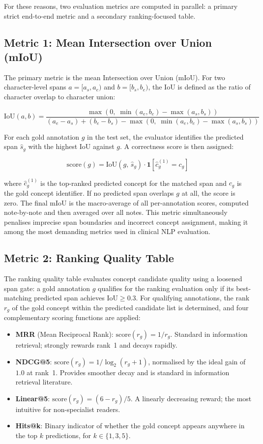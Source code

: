 For these reasons, two evaluation metrics are computed in parallel: a primary strict end-to-end metric and a secondary ranking-focused table.

\subsection{Metric 1: Mean Intersection over Union (mIoU)}

The primary metric is the mean Intersection over Union (mIoU). For two character-level spans $a = [a_s, a_e)$ and $b = [b_s, b_e)$, the IoU is defined as the ratio of character overlap to character union:

$$\text{IoU}(a, b) = \frac{\max(0,\; \min(a_e, b_e) - \max(a_s, b_s))}{(a_e - a_s) + (b_e - b_s) - \max(0,\; \min(a_e, b_e) - \max(a_s, b_s))}$$

For each gold annotation $g$ in the test set, the evaluator identifies the predicted span $\hat{s}_g$ with the highest IoU against $g$. A correctness score is then assigned:

$$\text{score}(g) = \text{IoU}(g,\, \hat{s}_g) \cdot \mathbf{1}\!\left[\hat{c}^{(1)}_g = c_g\right]$$

where $\hat{c}^{(1)}_g$ is the top-ranked predicted concept for the matched span and $c_g$ is the gold concept identifier. If no predicted span overlaps $g$ at all, the score is zero. The final mIoU is the macro-average of all per-annotation scores, computed note-by-note and then averaged over all notes. This metric simultaneously penalises imprecise span boundaries and incorrect concept assignment, making it among the most demanding metrics used in clinical NLP evaluation.

\subsection{Metric 2: Ranking Quality Table}

The ranking quality table evaluates concept candidate quality using a loosened span gate: a gold annotation $g$ qualifies for the ranking evaluation only if its best-matching predicted span achieves $\text{IoU} \geq 0.3$. For qualifying annotations, the rank $r_g$ of the gold concept within the predicted candidate list is determined, and four complementary scoring functions are applied:

\begin{itemize}
    \item \textbf{MRR} (Mean Reciprocal Rank): $\text{score}(r_g) = 1/r_g$. Standard in information retrieval; strongly rewards rank~1 and decays rapidly.
    \item \textbf{NDCG@5}: $\text{score}(r_g) = 1/\log_2(r_g + 1)$, normalised by the ideal gain of $1.0$ at rank~1. Provides smoother decay and is standard in information retrieval literature.
    \item \textbf{Linear@5}: $\text{score}(r_g) = (6 - r_g) / 5$. A linearly decreasing reward; the most intuitive for non-specialist readers.
    \item \textbf{Hits@k}: Binary indicator of whether the gold concept appears anywhere in the top $k$ predictions, for $k \in \{1, 3, 5\}$.
\end{itemize}

